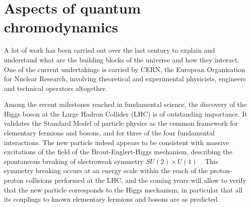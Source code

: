 \chapter{Aspects of quantum chromodynamics}
\label{chap:pqcd}

\minitoc
{}

A lot of work has been carried out over the last century to
explain and understand what are the building blocks of the universe and how they interact. One of the
current undertakings is carried by CERN, the European Organisation for
Nuclear Research, involving theoretical and experimental physicists,
engineers and technical operators altogether.

Among the recent milestones reached in fundamental science, the discovery of the
Higgs boson at the Large Hadron Collider (LHC) is of outstanding importance. It validates the Standard Model of particle physics as the common framework for elementary fermions and bosons, and for three of the four fundamental interactions. 
The new particle indeed appears to be consistent
with massive excitations of the field of the Brout-Englert-Higgs mechanism,
describing the spontaneous breaking of electroweak symmetry $SU(2)
\times U(1)$~\cite{Dawson:1998yi}. This symmetry breaking occurs at an
energy scale within the reach of the proton-proton collisions
performed at the LHC, and the coming years will allow to verify that the new
particle corresponds to the Higgs mechanism, in particular that
all its couplings to known elementary fermions and
bosons are as predicted.

